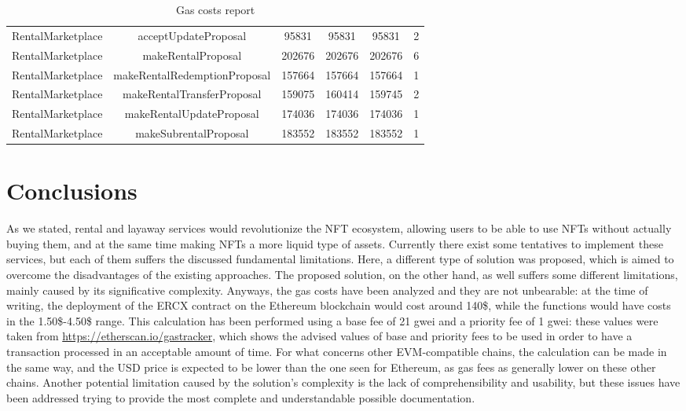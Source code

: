 \documentclass[english, LaM, oneside]{sapthesis}%
\begin{document}
\begin{table}
\begin{adjustbox}{width=0.75\textwidth}
\begin{tabular}{@{}cccccc@{}}
RentalMarketplace  & acceptUpdateProposal         & 95831        & 95831        & 95831        & 2                \\
RentalMarketplace  & makeRentalProposal           & 202676       & 202676       & 202676       & 6                \\
RentalMarketplace  & makeRentalRedemptionProposal & 157664       & 157664       & 157664       & 1                \\
RentalMarketplace  & makeRentalTransferProposal   & 159075       & 160414       & 159745       & 2                \\
RentalMarketplace  & makeRentalUpdateProposal     & 174036       & 174036       & 174036       & 1                \\
RentalMarketplace  & makeSubrentalProposal        & 183552       & 183552       & 183552       & 1                \\ \bottomrule
\end{tabular}
\end{adjustbox}
\caption{Gas costs report}
\label{tab:Gas report}
\end{table}



\chapter{Conclusions}
As we stated, rental and layaway services would revolutionize the NFT ecosystem, allowing users to be able to use NFTs without actually buying them, and at the same time making NFTs a more liquid type of assets. \newline
Currently there exist some tentatives to implement these services, but each of them suffers the discussed fundamental limitations. Here, a different type of solution was proposed, which is aimed to overcome the disadvantages of the existing approaches. The proposed solution, on the other hand, as well suffers some different limitations, mainly caused by its significative complexity. Anyways, the gas costs have been analyzed and they are not unbearable: at the time of writing, the deployment of the ERCX contract on the Ethereum blockchain would cost around 140\$, while the functions would have costs in the 1.50\$-4.50\$ range. This calculation has been performed using a base fee of 21 gwei and a priority fee of 1 gwei: these values were taken from \url{https://etherscan.io/gastracker}, which shows the advised values of base and priority fees to be used in order to have a transaction processed in an acceptable amount of time. For what concerns other EVM-compatible chains, the calculation can be made in the same way, and the USD price is expected to be lower than the one seen for Ethereum, as gas fees as generally lower on these other chains.\newline
Another potential limitation caused by the solution's complexity is the lack of comprehensibility and usability, but these issues have been addressed trying to provide the most complete and understandable possible documentation. 
\end{document}
